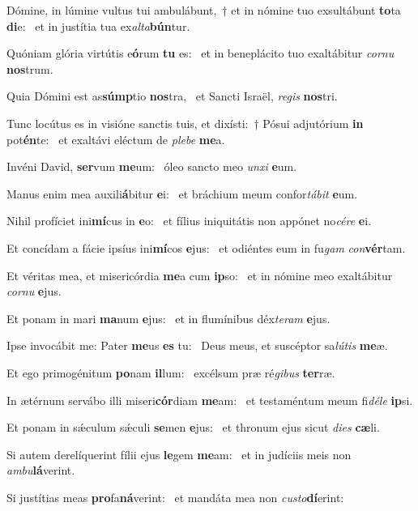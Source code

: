 \item Dómine, in lúmine vultus tui ambulábunt,~† et in nómine tuo exsultábunt \textbf{to}ta \textbf{di}e:~\psstar{} et in justítia tua ex\textit{alta}\textbf{bún}tur.
\item Quóniam glória virtútis e\textbf{ó}rum \textbf{tu} es:~\psstar{} et in beneplácito tuo exaltábitur \textit{cornu} \textbf{nos}trum.
\item Quia Dómini est as\textbf{súmp}tio \textbf{nos}tra,~\psstar{} et Sancti Israël, \textit{regis} \textbf{nos}tri.
\item Tunc locútus es in visióne sanctis tuis, et dixísti:~† Pósui adjutórium \textbf{in} pot\textbf{én}te:~\psstar{} et exaltávi eléctum de \textit{plebe} \textbf{me}a.
\item Invéni David, \textbf{ser}vum \textbf{me}um:~\psstar{} óleo sancto meo \textit{unxi} \textbf{e}um.
\item Manus enim mea auxili\textbf{á}bitur \textbf{e}i:~\psstar{} et bráchium meum confor\textit{tábit} \textbf{e}um.
\item Nihil profíciet ini\textbf{mí}cus in \textbf{e}o:~\psstar{} et fílius iniquitátis non appónet no\textit{cére} \textbf{e}i.
\item Et concídam a fácie ipsíus ini\textbf{mí}cos \textbf{e}jus:~\psstar{} et odiéntes eum in fu\textit{gam} \textit{con}\textbf{vér}tam.
\item Et véritas mea, et misericórdia \textbf{me}a cum \textbf{ip}so:~\psstar{} et in nómine meo exaltábitur \textit{cornu} \textbf{e}jus.
\item Et ponam in mari \textbf{ma}num \textbf{e}jus:~\psstar{} et in flumínibus déx\textit{teram} \textbf{e}jus.
\item Ipse invocábit me: Pater \textbf{me}us \textbf{es} tu:~\psstar{} Deus meus, et suscéptor sa\textit{lútis} \textbf{me}æ.
\item Et ego primogénitum \textbf{po}nam \textbf{il}lum:~\psstar{} excélsum præ ré\textit{gibus} \textbf{ter}ræ.
\item In ætérnum servábo illi miseri\textbf{cór}diam \textbf{me}am:~\psstar{} et testaméntum meum fi\textit{déle} \textbf{ip}si.
\item Et ponam in sǽculum sǽculi \textbf{se}men \textbf{e}jus:~\psstar{} et thronum ejus sicut \textit{dies} \textbf{cæ}li.
\item Si autem derelíquerint fílii ejus \textbf{le}gem \textbf{me}am:~\psstar{} et in judíciis meis non \textit{ambu}\textbf{lá}verint.
\item Si justítias meas \textbf{pro}fa\textbf{ná}ve\-rint:~\psstar{} et mandáta mea non \textit{custo}\textbf{dí}erint:
